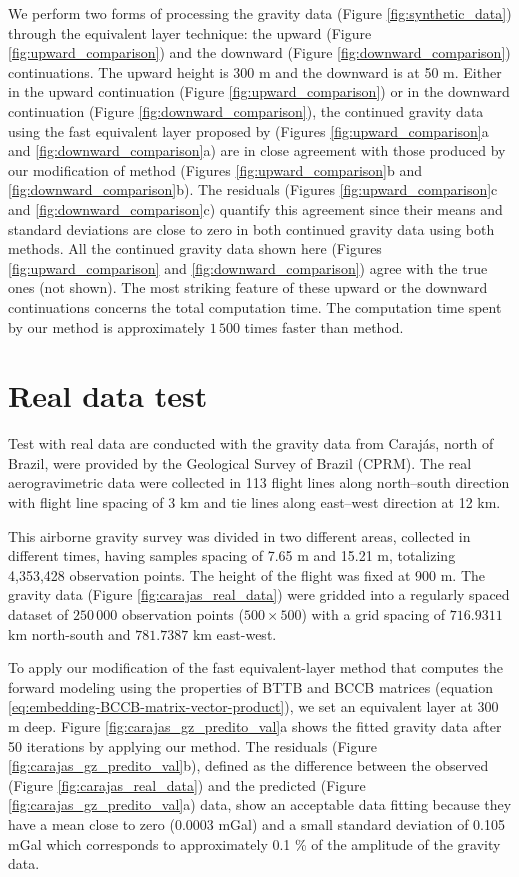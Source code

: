 \documentclass[manuscript,revised]{geophysics}
\begin{document}
We perform two forms of processing the gravity data (Figure \ref{fig:synthetic_data}) through the equivalent layer technique: the upward (Figure \ref{fig:upward_comparison}) and the downward (Figure \ref{fig:downward_comparison}) continuations. The upward height is 300 m and the downward  is at 50 m.   Either in the upward continuation (Figure \ref{fig:upward_comparison}) or in the downward continuation (Figure \ref{fig:downward_comparison}), the continued gravity data using the fast equivalent layer proposed by \citet{siqueira-etal2017} (Figures \ref{fig:upward_comparison}a and \ref{fig:downward_comparison}a) are in close agreement with those produced by our modification of \citet{siqueira-etal2017} method (Figures \ref{fig:upward_comparison}b and \ref{fig:downward_comparison}b). The residuals (Figures \ref{fig:upward_comparison}c and \ref{fig:downward_comparison}c) quantify this agreement since their means and standard deviations are close to zero in both continued gravity data using both methods.  All the continued gravity data shown here (Figures \ref{fig:upward_comparison} and \ref{fig:downward_comparison}) agree with the true ones (not shown). The most striking feature of these upward or the downward continuations concerns the total computation time. The computation time spent by our method is approximately $1\,500$ times faster than \citet{siqueira-etal2017} method. 


\section{Real data test}
Test with real data are conducted with the gravity data from Caraj\'as, north of Brazil, were provided by the  Geological Survey of Brazil (CPRM). The real aerogravimetric data were collected in 113 flight lines along north–south direction with flight line spacing  of 3 km and tie lines along east–west direction at 12 km.

This airborne gravity survey was divided in two different areas, collected in different times, having samples spacing of 7.65 m and 15.21 m, totalizing  4,353,428 observation points. The height of the flight was fixed at 900 m. The gravity data (Figure \ref{fig:carajas_real_data}) were gridded into a regularly spaced dataset of $250\,000$ observation points ($500 \times 500$) with a grid spacing of $716.9311$ km north-south and $781.7387$ km east-west.

To apply our modification of the fast equivalent-layer method \cite[]{siqueira-etal2017}  that computes the forward modeling using the properties of BTTB and BCCB matrices (equation \ref{eq:embedding-BCCB-matrix-vector-product}), we set an equivalent layer at 300 m deep. Figure \ref{fig:carajas_gz_predito_val}a shows the fitted gravity data after 50 iterations by applying our method. The residuals (Figure \ref{fig:carajas_gz_predito_val}b), defined as the difference between the observed (Figure \ref{fig:carajas_real_data}) and the predicted (Figure \ref{fig:carajas_gz_predito_val}a) data,  show an acceptable data fitting because they have a mean close to zero (0.0003 mGal) and a small standard deviation of 0.105 mGal which corresponds to approximately 0.1 \% of the amplitude of the gravity data.
\end{document}
